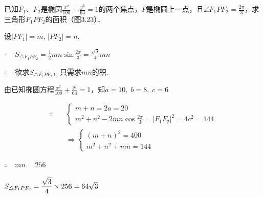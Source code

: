 \begin{example}
    已知$F_1$、$F_2$是椭圆$\frac{x^2}{100}+\frac{y^2}{64}=1$的两个焦点，$P$是椭圆上一点，且$\angle F_1PF_2=\frac{2\pi}{3}$，求三角形$F_1PF_2$的面积（图3.23）．
\end{example}

\begin{solution}
设$|PF_1|=m$, $|PF_2|=n$.

$\because \quad S_{\triangle F_1PF_2}=\frac{1}{2}mn\sin\frac{2\pi}{3}=\frac{\sqrt{3}}{4}mn$

$\therefore\quad $欲求$S_{\triangle F_1PF_2}$，只需求$mn$的积.

由已知椭圆方程$\frac{x^2}{100}+\frac{y^2}{64}=1$，知$a=10,\; b=8,\; c=6$

\noindent
\begin{minipage}{.57\textwidth}
\[\begin{split}
\because\quad &\begin{cases}
    m+n=2a=20\\
    m^2+n^2-2mn\cos\frac{2\pi}{3}=|F_1F_2|^2=4c^2=144
\end{cases}\\
& \Rightarrow \begin{cases}
    (m+n)^2=400\\
    m^2+n^2+mn=144
\end{cases}    
\end{split} \]

$\therefore\quad mn=256$

$S_{\triangle F_1PF_2}=\dfrac{\sqrt{3}}{4}\times 256=64\sqrt{3}$
\end{minipage}
\hfill
\begin{minipage}{.4\textwidth}
\centering
{}
\end{minipage}


\end{solution}

